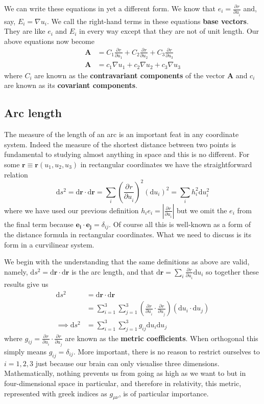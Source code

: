 \documentclass{tufte-handout}
\providecommand*{\pdif}[3][]{\frac{\partial^{#1}#2}{\partial #3^{#1}}}
\begin{document}
We can write these equations in yet a different form. We know that $e_i = \pdif{r}{u_i}$ and, say, $E_i = \nabla u_i$. We call the right-hand terms in these equations \textbf{base vectors}. They are like $e_i$ and $E_i$ in every way except that they are not of unit length. Our above equations now become
\begin{align}
	\mathbf{A} &= C_1 \pdif{r}{u_1} + C_2 \pdif{r}{u_2} + C_3 \pdif{r}{u_3} \label{eq:contravariant-vector-components} \\
	\mathbf{A} &= c_1 \nabla u_1 + c_2 \nabla u_2 + c_3 \nabla u_3 \label{eq:covariant-vector-components}
\end{align}
where $C_i$ are known as the \textbf{contravariant components} of the vector $\mathbf{A}$ and $c_i$ are known as its \textbf{covariant components}.

\subsection{Arc length}

The measure of the length of an arc is an important feat in any coordinate system. Indeed the measure of the shortest distance between two points is fundamental to studying almost anything in space and this is no different. For some $\mathbf{r} \equiv \mathbf{r} (u_1,u_2,u_3)$ in rectangular coordinates we have the straightforward relation \[ \textrm{d}s^2 = \textrm{d}\mathbf{r \cdot}\textrm{d}\mathbf{r} = \sum_i \left( \pdif{r}{u_i} \right)^2 \left(\textrm{d}u_i\right)^2 = \sum_i h_i^2 \textrm{d}u_i^2 \] where we have used our previous definition $h_i e_i = \left| \pdif{r}{u_i} \right|$ but we omit the $e_i$ from the final term because $\mathbf{e_i\cdot e_j} = \delta_{ij}$. Of course all this is well-known as a form of the distance formula in rectangular coordinates. What we need to discuss is its form in a curvilinear system.

We begin with the understanding that the same definitions as above are valid, namely, $\textrm{d}s^2 = \textrm{d}\mathbf{r \cdot}\textrm{d}\mathbf{r}$ is the arc length, and that $\textrm{d}\mathbf{r} = \sum_i \pdif{r}{u_i} \textrm{d}u_i$ so together these results give us
\begin{align}
	\textrm{d}s^2 &= \textrm{d}\mathbf{r \cdot}\textrm{d}\mathbf{r} \nonumber \\
					&= \sum_{i=1}^3 \sum_{j=1}^3 \left(\pdif{r}{u_i}\cdot\pdif{r}{u_j}\right)\left(\textrm{d}u_i\cdot\textrm{d}u_j\right) \nonumber \\
	\implies\textrm{d}s^2	&= \sum_{i=1}^3 \sum_{j=1}^3 g_{ij} \textrm{d}u_i \textrm{d}u_j \label{eq:arc-length}
\end{align}
where $g_{ij} = \pdif{r}{u_i}\cdot\pdif{r}{u_j}$ are known as the \textbf{metric coefficients}. When orthogonal this simply means $g_{ij} = \delta_{ij}$. More important, there is no reason to restrict ourselves to $i = 1, 2, 3$ just because our brain can only visualise three dimensions. Mathematically, nothing prevents us from going as high as we want to but in four-dimensional space in particular, and therefore in relativity, this metric, represented with greek indices as $g_{\mu\nu}$, is of particular importance.
\end{document}
